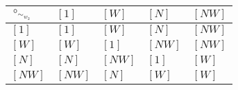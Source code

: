 \begin{tabularx}{0.6\textwidth}{l|llll}
$\circ_{\sim_{w_{2}}}$ & $[1]$ & $[W]$ & $[N]$ & $[NW]$ \\
\hline
$[1]$ & $[1]$ & $[W]$ & $[N]$ & $[NW]$ \\
$[W]$ & $[W]$ & $[1]$ & $[NW]$ & $[NW]$ \\
$[N]$ & $[N]$ & $[NW]$ & $[1]$ & $[W]$ \\
$[NW]$ & $[NW]$ & $[N]$ & $[W]$ & $[W]$ \\
\end{tabularx}
